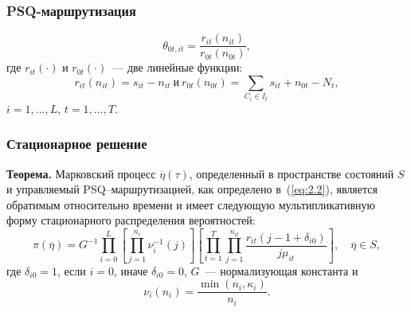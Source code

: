 \begin{frame} \frametitle{PSQ-маршрутизация}
\vfill
\begin{equation}
 \theta_{0t,it} = \frac{r_{it}(n_{it})} {r_{0t}(n_{0t})},
\label{eq:2.2}
\end{equation}
\vfill
где $r_{it}(\cdot)$ и $r_{0t}(\cdot)$~--- две линейные функции:
\vfill
\begin{equation*}
 r_{it}(n_{it}) = s_{it} - n_{it} ~ \text{и} ~ r_{0t}(n_{0t}) = \sum_{C_i \in I_t} s_{it} + n_{0t} - N_t,
\end{equation*}
$i=1,...,L$, $t=1,...,T$.
\vfill
\end{frame}


\begin{frame} \frametitle{Стационарное решение}
\textbf{Теорема\footnotemark.} Марковский процесс $\overline{\eta}(\tau)$, определенный в пространстве состояний $S$ и управляемый PSQ--маршрутизацией, как определено в~(\ref{eq:2.2}), является обратимым относительно времени и имеет следующую мультипликативную форму стационарного распределения вероятностей:
 \begin{equation}
  \pi(\overline{\eta}) = G^{-1} \prod_{i=0}^L \left[ \prod_{j=1}^{n_i} \nu_i^{-1} (j) \right]
  \left[ \prod_{t=1}^T \prod_{j=1}^{n_{it}} \frac{r_{it} (j - 1 + \delta_{i0})}{j\mu_{it}} \right], \quad \overline{\eta} \in S ,
  \label{eq:2.4}
 \end{equation}
где $\delta_{i0}=1$, если $i=0$, иначе $\delta_{i0}=0$, $G$~--- нормализующая константа и
\begin{equation*}
\nu_i(n_i) = \frac{\min(n_i, \kappa_i)}{n_i} .
\end{equation*}
\end{frame}



